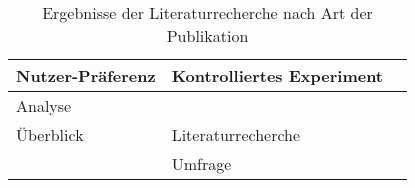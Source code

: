 \begin{table}[hbt!]
\begin{center}
\begin{tabular}{p{}p{}p{}}
            Nutzer-Präferenz                                                                &
            Kontrolliertes Experiment                                                       &
                \cite{kouki_user_2017} \cite{mucha_interfaces_2021} \cite{abdulrahman_belief-based_2019} \cite{waa_evaluating_2021} \cite{wiegand_id_2020} \cite{stange_effects_2021} \cite{kaptein_personalised_2017} \cite{wiegand2019drive} \cite{du2019look}
            \\
            \midrule
            Analyse &  & \\
            Überblick                                                                       &
            Literaturrecherche                                                              &
                \cite{chazette_knowledge_nodate} \cite{sokol_explainability_2020} \cite{tintarev2015explaining} \cite{kohl_explainability_2019} \cite{rosenfeld_explainability_2019} \cite{cassens_ambient_2019} \cite{cirqueira_scenario-based_2020} \cite{rjoob_towards_2021} \cite{thomson_knowledge--information_2020} \cite{chari_explanation_2020} \cite{nunes_systematic_2017} \cite{sovrano_modelling_2020} \cite{ribera2019can} \cite{gunning2019darpa} \cite{doshi2017towards} \cite{lim_2009_assessing} \cite{tintarev2007survey}
                \\
                                                                                            &
            Umfrage                                                                         &
                \cite{brennen_what_2020} 
            \\ \toprule
        \end{tabular}
    \end{center}
    \caption{Ergebnisse der Literaturrecherche nach Art der Publikation}
    \label{tab:results_paper_types}
\end{table}
